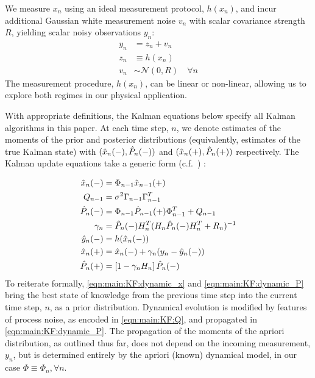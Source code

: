 We measure $x_n$ using an ideal measurement protocol, $h(x_n)$, and incur additional Gaussian white measurement noise $v_n$ with scalar covariance strength $R$, yielding scalar noisy observations $y_n$:
\begin{align}
y_n &= z_n + v_n \\
z_n & \equiv  h(x_n) \\
v_n & \sim \mathcal{N}(0, R) \quad \forall n
\end{align}
The measurement procedure, $h(x_n)$, can be linear or non-linear, allowing us to explore both regimes in our physical application.

With appropriate definitions, the Kalman equations below specify all Kalman algorithms in this paper. At each time step, $n$, we denote estimates of the moments of the prior and posterior distributions (equivalently, estimates of the true Kalman state) with $(\hat{x}_{n}(-), \hat{P}_{n}(-))$ and $(\hat{x}_{n}(+), \hat{P}_{n}(+))$ respectively. The Kalman update equations take a generic form (c.f.~\cite{grewal2001theory}) :

\begin{align}
\hat{x}_{n}(-) & = \Phi_{n-1} \hat{x}_{n-1}(+) \label{eqn:main:KF:dynamic_x}\\ 
Q_{n-1} & = \sigma^2 \Gamma_{n-1}\Gamma_{n-1}^T  \label{eqn:main:KF:Q}\\
\hat{P}_{n}(-)&= \Phi_{n-1} \hat{P}_{n-1}(+) \Phi_{n-1}^T + Q_{n-1} \label{eqn:main:KF:dynamic_P}\\
\gamma_n &= \hat{P}_{n}(-) H_n^T(H_n\hat{P}_{n}(-)H_n^T + R_n)^{-1} \label{eqn:main:KF:gain}\\
\hat{y}_n(-) & = h(\hat{x}_{n}(-)) \label{eqn:main:KF:step_ahead}\\
\hat{x}_{n}(+) &= \hat{x}_{n}(-) + \gamma_n (y_n - \hat{y}_n(-)) \label{eqn:main:KF:bayesian_x}\\
\hat{P}_{n}(+) &= \left[1  - \gamma_n H_n \right] \hat{P}_{n}(-) \label{eqn:main:KF:bayesian_p}
\end{align}
To reiterate formally, \cref{eqn:main:KF:dynamic_x} and \cref{eqn:main:KF:dynamic_P} bring the best state of knowledge from the previous time step into the current time step, $n$, as a prior distribution. Dynamical evolution is modified by features of process noise, as encoded in \cref{eqn:main:KF:Q}, and propagated in \cref{eqn:main:KF:dynamic_P}. The propagation of the moments of the apriori distribution, as outlined thus far, does not depend on the incoming measurement, $y_n$, but is determined entirely by the apriori (known) dynamical model, in our case $\Phi \equiv \Phi_n, \forall n$. 

